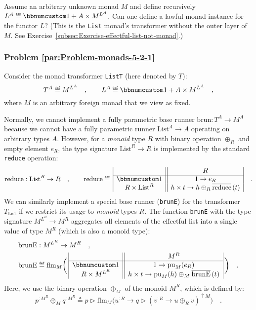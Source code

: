 Assume an arbitrary unknown monad $M$ and define recursively $L^{A}\triangleq\bbnum 1+A\times M^{L^{A}}$.
Can one define a lawful monad instance for the functor $L$? (This
is the \lstinline!List! monad\textsf{'}s transformer without the outer layer
of $M$. See Exercise~\ref{subsec:Exercise-effectful-list-not-monad}.)

\subsubsection{Problem \label{par:Problem-monads-5-2-1}\ref{par:Problem-monads-5-2-1}}

Consider the monad transformer \lstinline!ListT! (here denoted by
$T$): 
\[
T^{A}\triangleq M^{L^{A}}\quad,\quad\quad L^{A}\triangleq\bbnum 1+A\times M^{L^{A}}\quad,
\]
where $M$ is an arbitrary foreign monad that we view as fixed. 

Normally, we cannot implement a fully parametric base runner $\text{brun}:T^{A}\rightarrow M^{A}$
because we cannot have a fully parametric runner $\text{List}^{A}\rightarrow A$
operating on arbitrary types $A$. However, for a \emph{monoid} type
$R$ with binary operation $\oplus_{R}$ and empty element $e_{R}$,
the type signature $\text{List}^{R}\rightarrow R$ is implemented
by the standard \lstinline!reduce! operation: 
\[
\text{reduce}:\text{List}^{R}\rightarrow R\quad,\quad\quad\text{reduce}\triangleq\,\begin{array}{|c||c|}
 & R\\
\hline \bbnum 1 & 1\rightarrow e_{R}\\
R\times\text{List}^{R} & h\times t\rightarrow h\oplus_{R}\overline{\text{reduce}}\,(t)
\end{array}\quad.
\]
We can similarly implement a special base runner (\lstinline!brunE!)
for the transformer $T_{\text{List}}$ if we restrict its usage to
\emph{monoid} types $R$. The function \lstinline!brunE! with the
type signature $M^{L^{R}}\rightarrow M^{R}$ aggregates all elements
of the effectful list into a single value of type $M^{R}$ (which
is also a monoid type):
\begin{align*}
 & \text{brunE}:M^{L^{R}}\rightarrow M^{R}\quad,\\
 & \text{brunE}\triangleq\text{flm}_{M}\bigg(\,\begin{array}{|c||c|}
 & M^{R}\\
\hline \bbnum 1 & 1\rightarrow\text{pu}_{M}(e_{R})\\
R\times M^{L^{R}} & h\times t\rightarrow\text{pu}_{M}(h)\oplus_{M}\overline{\text{brunE}}\,(t)
\end{array}\,\bigg)\quad.
\end{align*}
Here, we use the binary operation $\oplus_{M}$ of the monoid $M^{R}$,
which is defined by:
\[
p^{:M^{R}}\oplus_{M}q^{:M^{R}}\triangleq p\triangleright\text{flm}_{M}\big(u^{:R}\rightarrow q\triangleright(v^{:R}\rightarrow u\oplus_{R}v)^{\uparrow M}\big)\quad.
\]

